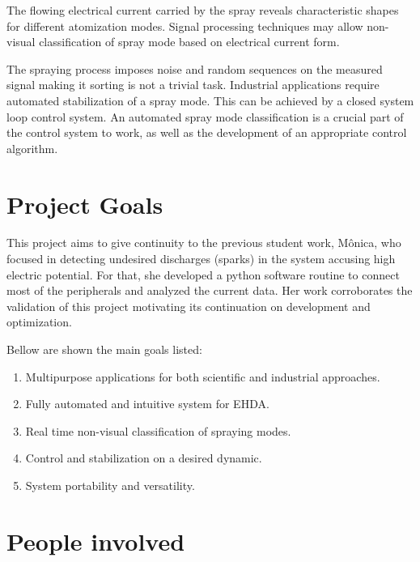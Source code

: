 The flowing electrical current carried by the spray reveals characteristic shapes for different atomization modes.
Signal processing techniques may allow non-visual classification of spray mode based on electrical current form. 

The spraying process imposes noise and random sequences on the measured signal making it sorting is not a trivial task.
Industrial applications require automated stabilization of a spray mode. 
This can be achieved by a closed system loop control system. 
An automated spray mode classification is a crucial part of the control system to work, as well as the development of an appropriate control algorithm.

\section{Project Goals}
\label{sec:goals}

This project aims to give continuity to the previous student work\cite{Monica}, 
Mônica, who focused in detecting undesired discharges (sparks) in the system accusing high electric potential. 
For that, she developed a python software routine to connect most of the peripherals and analyzed the current data.
Her work corroborates the validation of this project motivating its continuation on development and optimization.

Bellow are shown the main goals listed:

\begin{enumerate}[]
\item Multipurpose applications for both scientific and industrial approaches.
\item Fully automated and intuitive system for EHDA.
\item Real time non-visual classification of spraying modes.
\item Control and stabilization on a desired dynamic. 
\item System portability and versatility.
\end{enumerate}


\section{People involved}
\label{sec:companies}


